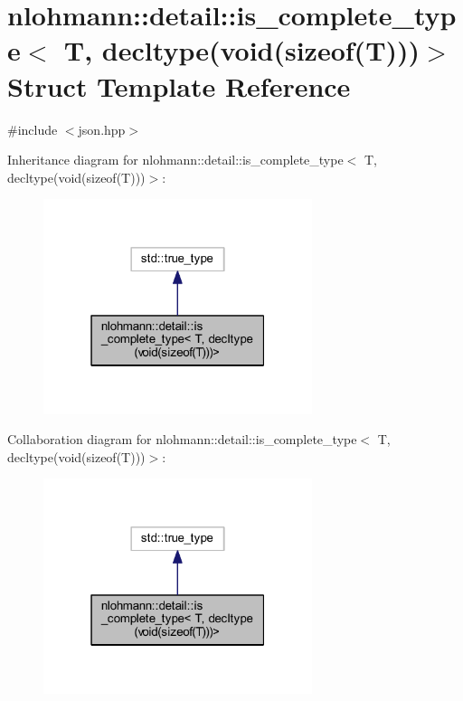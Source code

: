 \hypertarget{structnlohmann_1_1detail_1_1is__complete__type_3_01_t_00_01decltype_07void_07sizeof_07_t_08_08_08_4}{}\section{nlohmann\+::detail\+::is\+\_\+complete\+\_\+type$<$ T, decltype(void(sizeof(T)))$>$ Struct Template Reference}
\label{structnlohmann_1_1detail_1_1is__complete__type_3_01_t_00_01decltype_07void_07sizeof_07_t_08_08_08_4}


{\ttfamily \#include $<$json.\+hpp$>$}



Inheritance diagram for nlohmann\+::detail\+::is\+\_\+complete\+\_\+type$<$ T, decltype(void(sizeof(T)))$>$\+:
\nopagebreak
\begin{figure}[H]
\begin{center}
\leavevmode
\includegraphics[width=223pt]{structnlohmann_1_1detail_1_1is__complete__type_3_01_t_00_01decltype_07void_07sizeof_07_t_08_08_08_4__inherit__graph}
\end{center}
\end{figure}


Collaboration diagram for nlohmann\+::detail\+::is\+\_\+complete\+\_\+type$<$ T, decltype(void(sizeof(T)))$>$\+:
\nopagebreak
\begin{figure}[H]
\begin{center}
\leavevmode
\includegraphics[width=223pt]{structnlohmann_1_1detail_1_1is__complete__type_3_01_t_00_01decltype_07void_07sizeof_07_t_08_08_08_4__coll__graph}
\end{center}
\end{figure}


